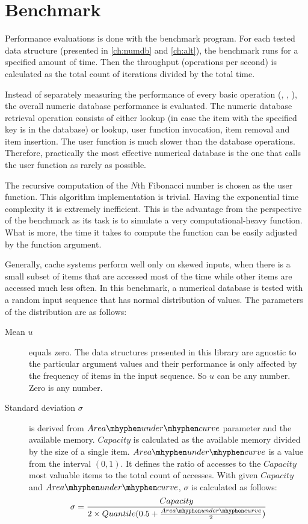 \section{Benchmark}

Performance evaluations is done with the benchmark program. For each tested data structure (presented in \cref{ch:numdb} and \cref{ch:alt}), the benchmark runs for a specified amount of time. Then the throughput (operations per second) is calculated as the total count of iterations divided by the total time.

Instead of separately measuring the performance of every basic operation (\findop, \insertop, \removeop), the overall numeric database performance is evaluated. The numeric database retrieval operation consists of either lookup (in case the item with the specified key is in the database) or lookup, user function invocation, item removal and item insertion. The user function is much slower than the database operations. Therefore, practically the most effective numerical database is the one that calls the user function as rarely as possible.

The recursive computation of the $N$th Fibonacci number is chosen as the user function. This algorithm implementation is trivial. Having the exponential time complexity it is extremely inefficient. This is the advantage from the perspective of the benchmark as its task is to simulate a very computational-heavy function. What is more, the time it takes to compute the function can be easily adjusted by the function argument.

Generally, cache systems perform well only on skewed inputs, when there is a small subset of items that are accessed most of the time while other items are accessed much less often. In this benchmark, a numerical database is tested with a random input sequence that has normal distribution of values. The parameters of the distribution are as follows:
\begin{description}
\item[Mean $u$] equals zero. The data structures presented in this library are agnostic to the particular argument values and their performance is only affected by the frequency of items in the input sequence. So $u$ can be any number. Zero is any number.

\item [Standard deviation $\sigma$] is derived from $Area{\mhyphen}under{\mhyphen}curve$ parameter and the available memory. $Capacity$ is calculated as the available memory divided by the size of a single item. $Area{\mhyphen}under{\mhyphen}curve$ is a value from the interval $(0,1)$. It defines the ratio of accesses to the $Capacity$ most valuable items to the total count of accesses. With given $Capacity$ and $Area{\mhyphen}under{\mhyphen}curve$, $\sigma$ is calculated as follows:
\begin{equation}
 \sigma = \frac{Capacity}{2 \times Quantile(0.5 + \frac{Area{\mhyphen}under{\mhyphen}curve}{2})}
 \end{equation}
\end{description}

